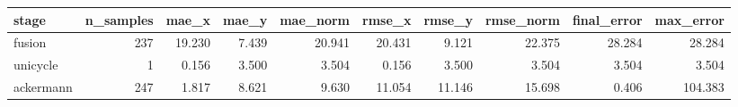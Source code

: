 \begin{tabular}{lrrrrrrrrr}
\hline
stage & n\_samples & mae\_x & mae\_y & mae\_norm & rmse\_x & rmse\_y & rmse\_norm & final\_error & max\_error \\
\hline
fusion & 237 & 19.230 & 7.439 & 20.941 & 20.431 & 9.121 & 22.375 & 28.284 & 28.284 \\
unicycle & 1 & 0.156 & 3.500 & 3.504 & 0.156 & 3.500 & 3.504 & 3.504 & 3.504 \\
ackermann & 247 & 1.817 & 8.621 & 9.630 & 11.054 & 11.146 & 15.698 & 0.406 & 104.383 \\
\hline
\end{tabular}